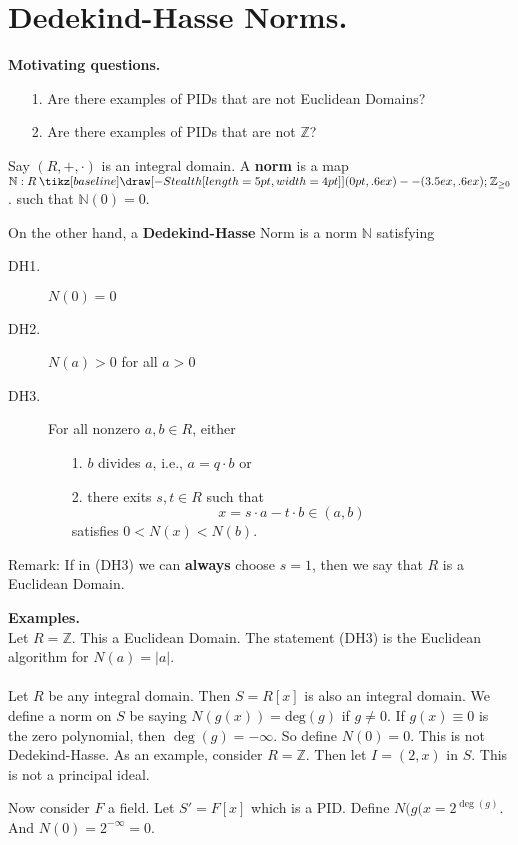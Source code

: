 \documentclass[12pt,letterpaper]{algebra_book}
\renewcommand{\to}{\mathbin{\tikz[baseline] \draw[-{Stealth[length=5pt,width=4pt]}] (0pt,.6ex) -- (3.5ex,.6ex);}}
\newcommand{\ZZ}{\mathbb{Z}}
\theoremstyle{definition}
\begin{document}
\section*{Dedekind-Hasse Norms.}
\textbf{Motivating questions.}
\begin{itemize}
    \item[1.] Are there examples of PIDs that are not Euclidean Domains?
    \item[2.] Are there examples of PIDs that are not $\ZZ$?  
\end{itemize}

Say $(R, +, \cdot)$ is an integral domain. A \textbf{norm} is a
map $\mathbb{N} : R \to \mathbb{Z}_{\ge 0}$. such that
$\mathbb{N}(0) = 0$.

On the other hand, a \textbf{Dedekind-Hasse} Norm is a norm
$\mathbb{N}$ satisfying 
\begin{description}
    \item[DH1.] ${N}(0) = 0$
    \item[DH2.] $N(a) > 0$ for all $a > 0$
    \item[DH3.] For all nonzero $a, b \in R$, either 
    \begin{itemize}
        \item[1.] $b$ divides $a$, i.e., $a = q \cdot b$ or 
        \item[2.] there exits $s, t \in R$ such that 
        \[
            x = s \cdot a -  t \cdot b \in  (a , b) 
        \]  
        satisfies $0 < N(x) < N(b)$.
    \end{itemize}   
\end{description}
Remark: If in (DH3) we can \textbf{always} choose $s = 1$, then we
say that $R$ is a Euclidean Domain.

\textbf{Examples.}\\
Let $R = \mathbb{Z}$. This a Euclidean Domain. The statement (DH3)
is the Euclidean algorithm for $N(a) = |a|$.
\\
\\
Let $R$ be any integral domain. Then $S = R[x]$ is also an
integral domain. We define a norm on $S$ be saying $N(g(x)) =
\text{deg}(g)$ if $g \ne 0$. If $g(x) \equiv 0$ is the zero
polynomial, then $\deg(g) = -\infty$. So define $N(0) = 0$. This
is not Dedekind-Hasse. As an example, consider $R = \ZZ$. Then let
$I =(2, x)$ in $S$. This is not a principal ideal.

Now consider $F$ a field. Let $S' = F[x]$ which is a PID. Define
$N(g(x= 2^{\deg(g)}$. And $N(0) = 2^{-\infty} = 0$.
\end{document}

